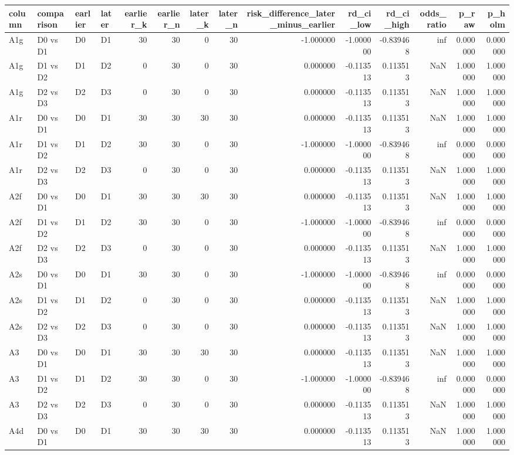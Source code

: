 \begin{tabular}{llllrrrrrrrrrr}
\toprule
column & comparison & earlier & later & earlier\_k & earlier\_n & later\_k & later\_n & risk\_difference\_later\_minus\_earlier & rd\_ci\_low & rd\_ci\_high & odds\_ratio & p\_raw & p\_holm \\
\midrule
A1g & D0 vs D1 & D0 & D1 & 30 & 30 & 0 & 30 & -1.000000 & -1.000000 & -0.839468 & inf & 0.000000 & 0.000000 \\
A1g & D1 vs D2 & D1 & D2 & 0 & 30 & 0 & 30 & 0.000000 & -0.113513 & 0.113513 & NaN & 1.000000 & 1.000000 \\
A1g & D2 vs D3 & D2 & D3 & 0 & 30 & 0 & 30 & 0.000000 & -0.113513 & 0.113513 & NaN & 1.000000 & 1.000000 \\
A1r & D0 vs D1 & D0 & D1 & 30 & 30 & 30 & 30 & 0.000000 & -0.113513 & 0.113513 & NaN & 1.000000 & 1.000000 \\
A1r & D1 vs D2 & D1 & D2 & 30 & 30 & 0 & 30 & -1.000000 & -1.000000 & -0.839468 & inf & 0.000000 & 0.000000 \\
A1r & D2 vs D3 & D2 & D3 & 0 & 30 & 0 & 30 & 0.000000 & -0.113513 & 0.113513 & NaN & 1.000000 & 1.000000 \\
A2f & D0 vs D1 & D0 & D1 & 30 & 30 & 30 & 30 & 0.000000 & -0.113513 & 0.113513 & NaN & 1.000000 & 1.000000 \\
A2f & D1 vs D2 & D1 & D2 & 30 & 30 & 0 & 30 & -1.000000 & -1.000000 & -0.839468 & inf & 0.000000 & 0.000000 \\
A2f & D2 vs D3 & D2 & D3 & 0 & 30 & 0 & 30 & 0.000000 & -0.113513 & 0.113513 & NaN & 1.000000 & 1.000000 \\
A2s & D0 vs D1 & D0 & D1 & 30 & 30 & 0 & 30 & -1.000000 & -1.000000 & -0.839468 & inf & 0.000000 & 0.000000 \\
A2s & D1 vs D2 & D1 & D2 & 0 & 30 & 0 & 30 & 0.000000 & -0.113513 & 0.113513 & NaN & 1.000000 & 1.000000 \\
A2s & D2 vs D3 & D2 & D3 & 0 & 30 & 0 & 30 & 0.000000 & -0.113513 & 0.113513 & NaN & 1.000000 & 1.000000 \\
A3 & D0 vs D1 & D0 & D1 & 30 & 30 & 30 & 30 & 0.000000 & -0.113513 & 0.113513 & NaN & 1.000000 & 1.000000 \\
A3 & D1 vs D2 & D1 & D2 & 30 & 30 & 0 & 30 & -1.000000 & -1.000000 & -0.839468 & inf & 0.000000 & 0.000000 \\
A3 & D2 vs D3 & D2 & D3 & 0 & 30 & 0 & 30 & 0.000000 & -0.113513 & 0.113513 & NaN & 1.000000 & 1.000000 \\
A4d & D0 vs D1 & D0 & D1 & 30 & 30 & 30 & 30 & 0.000000 & -0.113513 & 0.113513 & NaN & 1.000000 & 1.000000 \\

\end{tabular}

